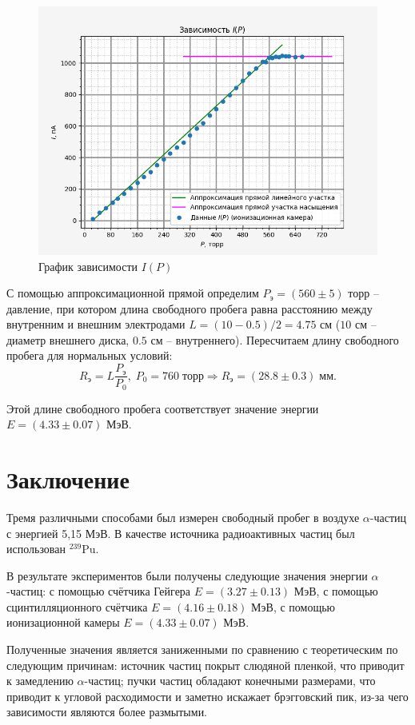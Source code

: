     \begin{figure}[h!]
        \centering
        \includegraphics[width = 14 cm]{images/method_3}
        \caption{График зависимости $I(P)$}
        \label{}
    \end{figure}

    С помощью аппроксимационной прямой определим $P_{\text{э}} = (560 \pm 5)$ торр -- давление, при котором длина свободного пробега равна расстоянию между внутренним и внешним электродами $L = (10 - 0.5) / 2 = 4.75$ см ($10$ см -- диаметр внешнего диска, $0.5$ см -- внутреннего). Пересчитаем длину свободного пробега для нормальных условий:
    \begin{equation}
        R_{\text{э}} = L \frac{P_{\text{э}}}{P_0}, \; P_0 = 760 \; \text{торр} \Rightarrow R_{\text{э}} = (28.8 \pm 0.3) \; \text{мм}.
    \end{equation}

    Этой длине свободного пробега соответствует значение энергии $E = (4.33 \pm 0.07)$ МэВ.

\section{Заключение}

    Тремя различными способами был измерен свободный пробег в воздухе $\alpha$-частиц с энергией 5,15 МэВ. В качестве источника радиоактивных частиц был использован $^{239}$Pu.

    В результате экспериментов были получены следующие значения энергии $\alpha$-частиц: с помощью счётчика Гейгера $E = (3.27 \pm 0.13)$ МэВ, с помощью сцинтилляционного счётчика $E = (4.16 \pm 0.18)$ МэВ, с помощью ионизационной камеры $E = (4.33 \pm 0.07)$ МэВ.

    Полученные значения является заниженными по сравнению с теоретическим по следующим причинам: источник частиц покрыт слюдяной пленкой, что приводит к замедлению $\alpha$-частиц; пучки частиц обладают конечными размерами, что приводит к угловой расходимости и заметно искажает брэгговский пик, из-за чего зависимости являются более размытыми.

